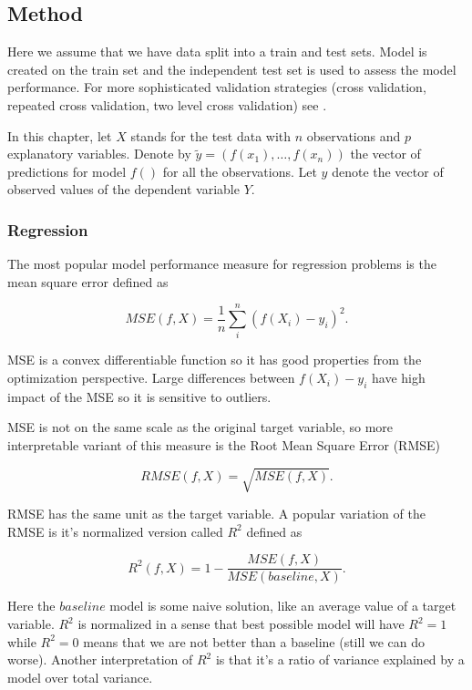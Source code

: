 \documentclass[12pt,]{krantz}
\begin{document}
\hypertarget{modelPerformanceMethod}{%
\subsection{Method}\label{modelPerformanceMethod}}

Here we assume that we have data split into a train and test sets. Model is created on the train set and the independent test set is used to assess the model performance. For more sophisticated validation strategies (cross validation, repeated cross validation, two level cross validation) see \citep{AppliedPredictiveModeling2013}.

In this chapter, let \(X\) stands for the test data with \(n\) observations and \(p\) explanatory variables. Denote by \(\widetilde{y}=(f(x_1),\ldots,f(x_n))\) the vector of predictions for model \(f()\) for all the observations. Let \(y\) denote the vector of observed values of the dependent variable \(Y\).

\hypertarget{regression}{%
\subsubsection{Regression}\label{regression}}

The most popular model performance measure for regression problems is the mean square error defined as

\[
MSE(f, X) = \frac{1}{n} \sum_{i}^{n} (f(X_i) - y_i)^2.
\]

MSE is a convex differentiable function so it has good properties from the optimization perspective.
Large differences between \(f(X_i) - y_i\) have high impact of the MSE so it is sensitive to outliers.

MSE is not on the same scale as the original target variable, so more interpretable variant of this measure is the Root Mean Square Error (RMSE)

\[
RMSE(f, X) = \sqrt{MSE(f, X)}.
\]

RMSE has the same unit as the target variable. A popular variation of the RMSE is it's normalized version called \(R^2\) defined as

\[
R^2(f, X) = 1 - \frac{MSE(f, X)}{MSE(baseline, X)}.
\]

Here the \(baseline\) model is some naive solution, like an average value of a target variable. \(R^2\) is normalized in a sense that best possible model will have \(R^2 = 1\) while \(R^2 = 0\) means that we are not better than a baseline (still we can do worse). Another interpretation of \(R^2\) is that it's a ratio of variance explained by a model over total variance.
\end{document}
